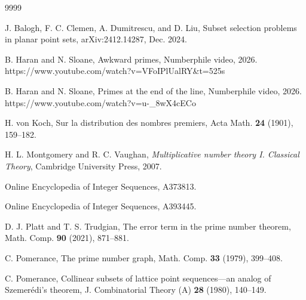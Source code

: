 \documentclass[10pt]{article}
\theoremstyle{definition}
\theoremstyle{remark}
\numberwithin{equation}{section}
\begin{document}
 \begin{thebibliography}{9999}
 
J. Balogh, F. C. Clemen, A. Dumitrescu, and D. Liu,
Subset selection problems in planar point sets,
arXiv:2412.14287, Dec. 2024.

 
  B. Haran and N. Sloane, Awkward primes, Numberphile video, 2026.
 https://www.youtube.com/watch?v=VFoIPlUalRY\&t=525s

 B. Haran and  N. Sloane, Primes at the end of the line, Numberphile video, 2026.
https://www.youtube.com/watch?v=u-\_8wX4cECo

  H. von Koch, Sur la distribution des nombres premiers, Acta Math. {\bf24} (1901), 159--182.
 
  H. L. Montgomery and R. C. Vaughan, \textit{Multiplicative number theory I. Classical Theory},
 Cambridge University Press, 2007.
 
  Online Encyclopedia of Integer Sequences, A373813.

  Online Encyclopedia of Integer Sequences, A393445.

 D. J. Platt and T.  S. Trudgian,
The error term in the prime number theorem, Math.  Comp. {\bf 90} (2021), 871--881.

 C. Pomerance, The prime number graph, Math. Comp. {\bf33}  (1979), 399--408.

 C. Pomerance, Collinear subsets of lattice point sequences---an analog of
Szemer\'edi's theorem, J. Combinatorial Theory (A) {\bf28} (1980), 140--149.


 \end{thebibliography}



 
\end{document}
